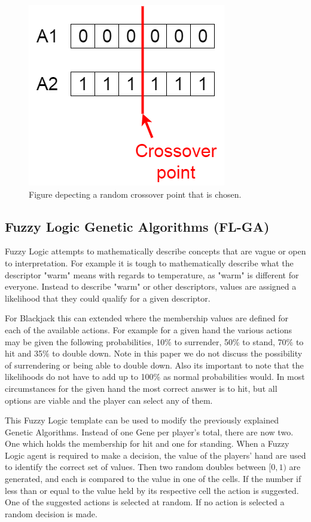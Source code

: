 \documentclass[10pt, a4paper, twocolumn]{article}
\begin{document}
\begin{figure}[H]
\centerline{\includegraphics[scale=0.25]{ga_crossover}}
\caption{Figure depecting a random crossover point that is chosen.}
\label{fig:ga_crossover}
\end{figure}

\subsection{Fuzzy Logic Genetic Algorithms (FL-GA)}

Fuzzy Logic attempts to mathematically describe concepts that are vague or open to interpretation. For example it is tough to mathematically describe what the descriptor "warm" means with regards to temperature, as "warm" is different for everyone. Instead to describe "warm" or other descriptors, values are assigned a likelihood that they could qualify for a given descriptor.

For Blackjack this can extended where the membership values are defined for each of the available actions. For example for a given hand the various actions may be given the following probabilities, 10\% to surrender, 50\% to stand, 70\% to hit and 35\% to double down. Note in this paper we do not discuss the possibility of surrendering or being able to double down. Also its important to note that the likelihoods do not have to add up to 100\% as normal probabilities would. In most circumstances for the given hand the most correct answer is to hit, but all options are viable and the player can select any of them. 

This Fuzzy Logic template can be used to modify the previously explained Genetic Algorithms. Instead of one Gene per player's total, there are now two. One which holds the membership for hit and one for standing. When a Fuzzy Logic agent is required to make a decision, the value of the players' hand are used to identify the correct set of values. Then two random doubles between $[0, 1)$ are generated, and each is compared to the value in one of the cells. If the number if less than or equal to the value held by its respective cell the action is suggested. One of the suggested actions is selected at random. If no action is selected a random decision is made. 
\end{document}
